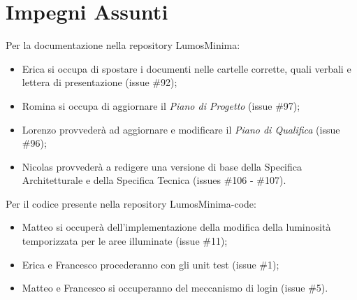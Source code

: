 \documentclass[a4paper, 12pt]{article}
\begin{document}
\section*{Impegni Assunti}

Per la documentazione nella repository LumosMinima:
\begin{itemize}
    \item Erica si occupa di spostare i documenti nelle cartelle corrette, quali verbali e lettera di presentazione (issue \#92);
    \item Romina si occupa di aggiornare il \textit{Piano di Progetto} (issue \#97);
    \item Lorenzo provvederà ad aggiornare e modificare il \textit{Piano di Qualifica} (issue \#96);
    \item Nicolas provvederà a redigere una versione di base della Specifica Architetturale e della Specifica Tecnica (issues \#106 - \#107).
\end{itemize}

Per il codice presente nella repository LumosMinima-code:
\begin{itemize}
    \item Matteo si occuperà dell'implementazione della modifica della luminosità temporizzata per le aree illuminate (issue \#11);
    \item Erica e Francesco procederanno con gli unit test (issue \#1);
    \item Matteo e Francesco si occuperanno del meccanismo di login (issue \#5).
\end{itemize}
\end{document}
